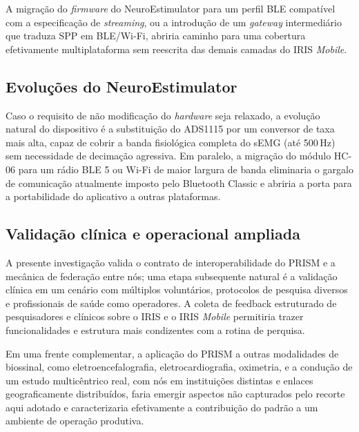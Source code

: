 A migração do \textit{firmware} do NeuroEstimulator para um perfil BLE compatível com a especificação de \textit{streaming}, ou a introdução de um \textit{gateway} intermediário que traduza SPP em BLE/Wi-Fi, abriria caminho para uma cobertura efetivamente multiplataforma sem reescrita das demais camadas do IRIS \textit{Mobile}.

\subsection{Evoluções do NeuroEstimulator}\label{subsec:trabalhosFuturosNeuroestimulator}

Caso o requisito de não modificação do \textit{hardware} seja relaxado, a evolução natural do dispositivo é a substituição do ADS1115 por um conversor de taxa mais alta, capaz de cobrir a banda fisiológica completa do sEMG (até 500\,Hz) sem necessidade de decimação agressiva. Em paralelo, a migração do módulo HC-06 para um rádio BLE 5 ou Wi-Fi de maior largura de banda eliminaria o gargalo de comunicação atualmente imposto pelo Bluetooth Classic e abriria a porta para a portabilidade do aplicativo a outras plataformas.

\subsection{Validação clínica e operacional ampliada}\label{subsec:trabalhosFuturosValidacao}

A presente investigação valida o contrato de interoperabilidade do PRISM e a mecânica de federação entre nós; uma etapa subsequente natural é a validação clínica em um cenário com múltiplos voluntários, protocolos de pesquisa diversos e profissionais de saúde como operadores. A coleta de feedback estruturado de pesquisadores e clínicos sobre o IRIS e o IRIS \textit{Mobile} permitiria trazer funcionalidades e estrutura mais condizentes com a rotina de perquisa.

Em uma frente complementar, a aplicação do PRISM a outras modalidades de biossinal, como eletroencefalografia, eletrocardiografia, oximetria, e a condução de um estudo multicêntrico real, com nós em instituições distintas e enlaces geograficamente distribuídos, faria emergir aspectos não capturados pelo recorte aqui adotado e caracterizaria efetivamente a contribuição do padrão a um ambiente de operação produtiva.

